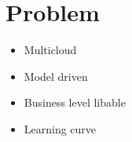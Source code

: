 \section{Problem}

\begin{itemize}
  \item Multicloud
  \item Model driven
  \item Business level libable
  \item Learning curve
\end{itemize}
